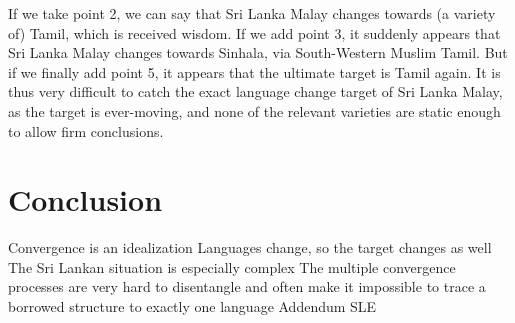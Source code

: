 \documentclass[handout,utf8]{article}
\begin{document}
If we take point 2, we can say that Sri Lanka Malay changes towards (a variety of) Tamil, which is received wisdom. If we add point 3, it suddenly appears that Sri Lanka Malay changes towards Sinhala, via South-Western Muslim Tamil. But if we finally add point 5, it appears that the ultimate target is Tamil again. It is thus very difficult to catch the exact language change target of Sri Lanka Malay, as the target is ever-moving, and none of the relevant varieties are static enough to allow firm conclusions. 





\section{Conclusion}
        Convergence is an idealization
        Languages change, so the target changes as well
        The Sri Lankan situation is especially complex
        The multiple convergence processes are very hard to disentangle and often make it impossible to trace a borrowed structure to exactly one language
    Addendum
        SLE
\end{document}
